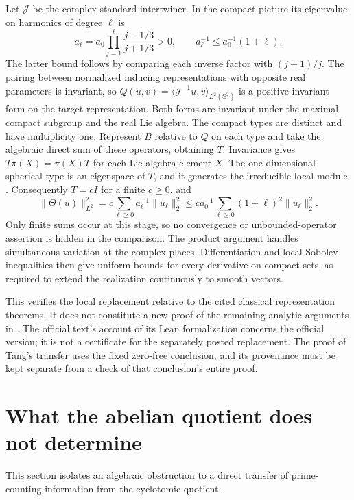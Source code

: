 \documentclass[11pt]{article}
\theoremstyle{definition}
\theoremstyle{remark}
\begin{document}
Let $\mathcal J$ be the complex standard intertwiner. In the
compact picture its eigenvalue on harmonics of degree $\ell$ is
\[
 a_\ell=a_0\prod_{j=1}^{\ell}
       \frac{j-1/3}{j+1/3}>0,
 \qquad a_\ell^{-1}\leq a_0^{-1}(1+\ell).
\]
The latter bound follows by comparing each inverse factor with
$(j+1)/j$. The pairing between normalized inducing representations
with opposite real parameters is invariant, so
$Q(u,v)=\langle\mathcal J^{-1}u,v\rangle_{L^2(\mathbb S^2)}$
is a positive invariant form on the target representation. Both
forms are invariant under the maximal compact subgroup and the
real Lie algebra. The compact types are distinct and have
multiplicity one. Represent $B$ relative to $Q$ on each type and
take the algebraic direct sum of these operators, obtaining $T$.
Invariance gives $T\pi(X)=\pi(X)T$ for each Lie algebra element
$X$. The one-dimensional spherical type is an eigenspace of $T$,
and it generates the irreducible local module
\cite[Theorem~I.6.4(c), p.~104]{KP1984}. Consequently $T=cI$
for a finite $c\geq0$, and
\[
 \|\Theta(u)\|_{L^2}^2
 =c\sum_{\ell\geq0}a_\ell^{-1}\|u_\ell\|_2^2
 \leq ca_0^{-1}\sum_{\ell\geq0}(1+\ell)^2\|u_\ell\|_2^2.
\]
Only finite sums occur at this stage, so no convergence or
unbounded-operator assertion is hidden in the comparison. The
product argument handles simultaneous variation at the complex
places. Differentiation and local Sobolev inequalities then give
uniform bounds for every derivative on compact sets, as required
to extend the realization continuously to smooth vectors.

This verifies the local replacement relative to the cited classical
representation theorems. It does not constitute a new proof of the
remaining analytic arguments in \cite{CT2026}. The official text's
account of its Lean formalization concerns the official version;
it is not a certificate for the separately posted replacement.
The proof of Tang's transfer uses the fixed zero-free conclusion,
and its provenance must be kept separate from a check of that
conclusion's entire proof.


\section{What the abelian quotient does not determine}
This section isolates an algebraic obstruction to a direct transfer of
prime-counting information from the cyclotomic quotient.
\end{document}
